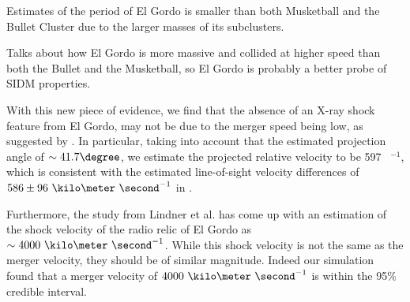 
Estimates of the period of El Gordo is smaller than both Musketball and
the Bullet Cluster due to the larger masses of its subclusters. 

Talks about how El Gordo is more massive and collided at higher speed than
both the Bullet and the Musketball, so El Gordo is probably a better probe of SIDM properties.

With this new piece of evidence, we find that the absence of an
X-ray shock feature from El Gordo, may not be due to the merger speed being
low, as suggested by . 
In particular, taking into account that the estimated projection angle of 
$\sim 41.7\degree$, we estimate the projected relative velocity to be 597
\kilo \meter~\second$^{-1}$, which is consistent with the estimated
line-of-sight velocity differences of $586 \pm  96~\kilo \meter
~\second^{-1}$ in . 

Furthermore, the study from \cite{L13} Lindner et al. has come up
with an estimation of the shock velocity of the radio relic of El Gordo as 
$\sim 4000~\kilo \meter~\second^{-1}$. While this shock velocity is not the
same as the merger velocity, they should be of similar magnitude. Indeed
our simulation found that a merger velocity of $4000~\kilo
\meter~\second^{-1}$ is within the 95\% credible interval. 
